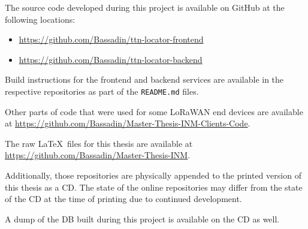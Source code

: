 
The source code developed during this project is available on GitHub at the following locations:

\begin{itemize}
    \item \url{https://github.com/Bassadin/ttn-locator-frontend}
    \item \url{https://github.com/Bassadin/ttn-locator-backend}
\end{itemize}

Build instructions for the frontend and backend services are available in the respective repositories as part of the \texttt{README.md} files.

Other parts of code that were used for some \ac{LoRaWAN} end devices are available at \url{https://github.com/Bassadin/Master-Thesis-INM-Clients-Code}.

The raw \LaTeX~files for this thesis are available at \url{https://github.com/Bassadin/Master-Thesis-INM}.

Additionally, those repositories are physically appended to the printed version of this thesis as a CD.
The state of the online repositories may differ from the state of the CD at the time of printing due to continued development.

A dump of the \acl{DB} built during this project is available on the CD as well.